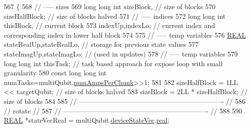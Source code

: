 \begin{DoxyCode}
567                                                                                              \{
568     \textcolor{comment}{// ----- sizes}
569     \textcolor{keywordtype}{long} \textcolor{keywordtype}{long} \textcolor{keywordtype}{int} sizeBlock,                                           \textcolor{comment}{// size of blocks}
570          sizeHalfBlock;                                       \textcolor{comment}{// size of blocks halved}
571     \textcolor{comment}{// ----- indices}
572     \textcolor{keywordtype}{long} \textcolor{keywordtype}{long} \textcolor{keywordtype}{int} thisBlock,                                           \textcolor{comment}{// current block}
573          indexUp,indexLo;                                     \textcolor{comment}{// current index and corresponding index in
       lower half block}
574 
575     \textcolor{comment}{// ----- temp variables}
576     \mbox{\hyperlink{QuEST__precision_8h_a4b654506f18b8bfd61ad2a29a7e38c25}{REAL}}   stateRealUp,stateRealLo,                             \textcolor{comment}{// storage for previous state values}
577            stateImagUp,stateImagLo;                             \textcolor{comment}{// (used in updates)}
578     \textcolor{comment}{// ----- temp variables}
579     \textcolor{keywordtype}{long} \textcolor{keywordtype}{long} \textcolor{keywordtype}{int} thisTask;                                   \textcolor{comment}{// task based approach for expose loop with
       small granularity}
580     \textcolor{keyword}{const} \textcolor{keywordtype}{long} \textcolor{keywordtype}{long} \textcolor{keywordtype}{int} numTasks=multiQubit.\mbox{\hyperlink{structMultiQubit_a1cad83601a78635dd278259c7ed54f18}{numAmpsPerChunk}}>>1;
581 
582     sizeHalfBlock = 1LL << targetQubit;                               \textcolor{comment}{// size of blocks halved}
583     sizeBlock     = 2LL * sizeHalfBlock;                           \textcolor{comment}{// size of blocks}
584 
585     \textcolor{comment}{// ---------------------------------------------------------------- //}
586     \textcolor{comment}{//            rotate                                                //}
587     \textcolor{comment}{// ---------------------------------------------------------------- //}
588 
590     \mbox{\hyperlink{QuEST__precision_8h_a4b654506f18b8bfd61ad2a29a7e38c25}{REAL}} *stateVecReal = multiQubit.\mbox{\hyperlink{structMultiQubit_a59ac613486a41b8c9a4b6e79cc8d2cc3}{deviceStateVec}}.\mbox{\hyperlink{structComplexArray_a4195cac6c784ea1b6271f1c7dba1548a}{real}};

\end{DoxyCode}
